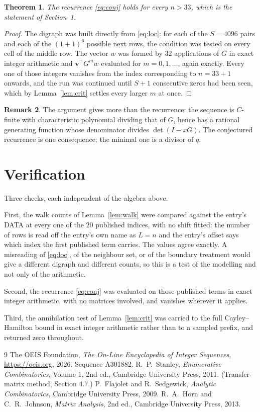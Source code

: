 \documentclass[11pt,a4paper]{article}
\theoremstyle{plain}
\newtheorem{theorem}{Theorem}
\theoremstyle{definition}
\newtheorem{remark}[theorem]{Remark}
\begin{document}
\begin{theorem}
The recurrence \eqref{eq:conj} holds for every $n>33$, which is the statement of
Section~1.
\end{theorem}

\begin{proof}
The digraph was built directly from \eqref{eq:loc}: for each of the $S=4096$ pairs and each
of the $(1+1)^{6}$ possible next rows, the condition was tested on every cell of
the middle row. The vector $w$ was formed by $32$ applications of $G$ in exact integer
arithmetic and $\mathbf{v}^{\!\top}G^{m}w$ evaluated for $m=0,1,\dots$, again exactly.
Every one of those integers vanishes from the index corresponding to $n=33+1$ onwards,
and the run was continued until $S+1$ consecutive zeros had been seen, which by
Lemma~\ref{lem:crit} settles every larger $m$ at once.
\end{proof}

\begin{remark}
The argument gives more than the recurrence: the sequence is $C$-finite with characteristic
polynomial dividing that of $G$, hence has a rational generating function whose denominator
divides $\det(I-xG)$. The conjectured recurrence is one consequence; the minimal one is a
divisor of $q$.
\end{remark}

\section{Verification}

Three checks, each independent of the algebra above.

First, the walk counts of Lemma~\ref{lem:walk} were compared against the entry's DATA at
every one of the $20$ published indices, with no shift fitted: the number of rows is
read off the entry's own name as $L=n$ and the entry's offset says which index the first
published term carries. The values agree exactly. A misreading of \eqref{eq:loc}, of the
neighbour set, or of the boundary treatment would give a different digraph and different
counts, so this is a test of the modelling and not only of the arithmetic.

Second, the recurrence \eqref{eq:conj} was evaluated on those published terms in exact
integer arithmetic, with no matrices involved, and vanishes wherever it applies.

Third, the annihilation test of Lemma~\ref{lem:crit} was carried to the full
Cayley--Hamilton bound in exact integer arithmetic rather than to a sampled prefix, and
returned zero throughout.

\begin{thebibliography}{9}
 The OEIS Foundation, \emph{The On-Line Encyclopedia of Integer
Sequences}, \url{https://oeis.org}, 2026. Sequence A301882.
 R.~P.~Stanley, \emph{Enumerative Combinatorics}, Volume 1, 2nd ed.,
Cambridge University Press, 2011. (Transfer-matrix method, Section 4.7.)
 P.~Flajolet and R.~Sedgewick, \emph{Analytic Combinatorics}, Cambridge
University Press, 2009.
 R.~A.~Horn and C.~R.~Johnson, \emph{Matrix Analysis}, 2nd ed., Cambridge
University Press, 2013.
\end{thebibliography}
\end{document}
